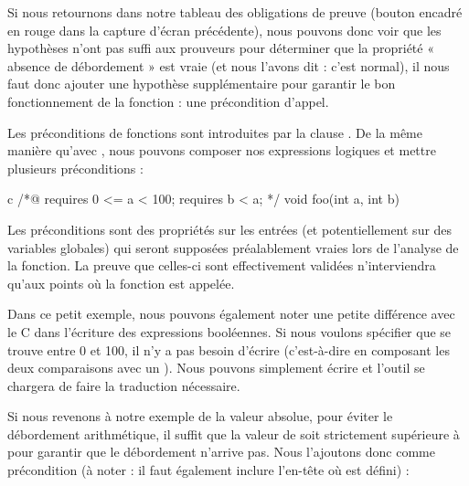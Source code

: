 Si nous retournons dans notre tableau des obligations de preuve (bouton 
encadré en rouge dans la capture d'écran précédente), nous pouvons donc voir
que les hypothèses n'ont pas suffi aux prouveurs pour déterminer que la
propriété  « absence de débordement » est vraie (et nous l'avons dit : c'est
normal), il nous faut donc ajouter une hypothèse supplémentaire pour garantir
le bon fonctionnement de la fonction : une précondition d'appel.





Les préconditions de fonctions sont introduites par la clause .
De la même manière qu'avec , nous pouvons composer nos 
expressions logiques et mettre plusieurs préconditions :



\begin{CodeBlock}{c}
/*@
  requires 0 <= a < 100;
  requires b < a;
*/
void foo(int a, int b){
  
}
\end{CodeBlock}



Les préconditions sont des propriétés sur les entrées (et potentiellement sur
des variables globales) qui seront supposées préalablement vraies lors de 
l'analyse de la fonction. La preuve que celles-ci sont effectivement validées 
n'interviendra qu'aux points où la fonction est appelée.



Dans ce petit exemple, nous pouvons également noter une petite différence avec 
le C dans l'écriture des expressions booléennes. Si nous voulons spécifier 
que  se trouve entre 0 et 100, il n'y a pas besoin d'écrire 
(c'est-à-dire en composant les deux comparaisons avec un \CodeInline{\&\&}). Nous 
pouvons simplement écrire  et l'outil se chargera de faire
la traduction nécessaire.



Si nous revenons à notre exemple de la valeur absolue, pour éviter le 
débordement arithmétique, il suffit que la valeur de  soit
strictement  supérieure à  pour garantir que le
débordement n'arrive pas.
Nous l'ajoutons donc comme précondition (à noter : il faut également
inclure l'en-tête où  est défini) :






